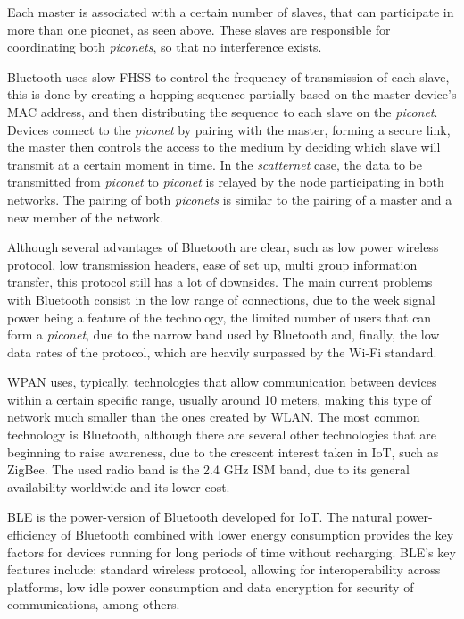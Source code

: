 Each master is associated with a certain number of slaves, that can participate in more than one piconet, as seen above. These slaves are responsible for coordinating both \textit{piconets}, so that no interference exists.

Bluetooth uses slow \gls{FHSS} to control the frequency of transmission of each slave, this is done by creating a hopping sequence partially based on the master device's \gls{MAC} address, and then distributing the sequence to each slave on the \textit{piconet}. Devices connect to the \textit{piconet} by pairing with the master, forming a secure link, the master then controls the access to the medium by deciding which slave will transmit at a certain moment in time. In the \textit{scatternet} case, the data to be transmitted from \textit{piconet} to \textit{piconet} is relayed by the node participating in both networks. The pairing of both \textit{piconets} is similar to the pairing of a master and a new member of the network.

Although several advantages of Bluetooth are clear, such as low power wireless protocol, low transmission headers, ease of set up, multi group information transfer, this protocol still has a lot of downsides. The main current problems with Bluetooth consist in the low range of connections, due to the week signal power being a feature of the technology, the limited number of users that can form a \textit{piconet}, due to the narrow band used by Bluetooth and, finally, the low data rates of the protocol, which are heavily surpassed by the Wi-Fi standard.

\gls{WPAN} uses, typically, technologies that allow communication between devices within a certain specific range, usually around 10 meters, making this type of network much smaller than the ones created by \gls{WLAN}. The most common technology is Bluetooth, although there are several other technologies that are beginning to raise awareness, due to the crescent interest taken in \gls{IoT}, such as ZigBee. The used radio band is the 2.4 GHz \gls{ISM} band, due to its general availability worldwide and its lower cost.

\gls{BLE} is the power-version of Bluetooth developed for \gls{IoT}. The natural power-efficiency of Bluetooth combined with lower energy consumption provides the key factors for devices running for long periods of time without recharging. \gls{BLE}'s key features include: standard wireless protocol, allowing for interoperability across platforms, low idle power consumption and data encryption for security of communications, among others.

